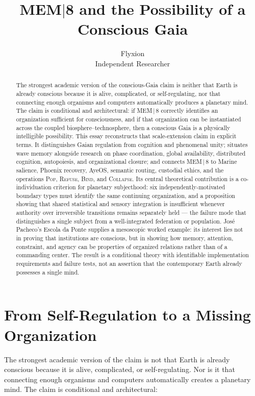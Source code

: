 \documentclass[11pt]{article}
\title{\textbf{MEM\texorpdfstring{$|$}{|}8 and the Possibility of a Conscious Gaia}}
\author{Flyxion \\ \small Independent Researcher}
\date{}
\newcommand{\Pop}{\textsc{Pop}}
\newcommand{\Refuse}{\textsc{Refuse}}
\newcommand{\Bind}{\textsc{Bind}}
\newcommand{\Collapse}{\textsc{Collapse}}
\begin{document}
\maketitle

\begin{abstract}
\noindent The strongest academic version of the conscious-Gaia claim is neither that Earth is already conscious because it is alive, complicated, or self-regulating, nor that connecting enough organisms and computers automatically produces a planetary mind. The claim is conditional and architectural: if MEM\,$|$\,8 correctly identifies an organization sufficient for consciousness, and if that organization can be instantiated across the coupled biosphere--technosphere, then a conscious Gaia is a physically intelligible possibility. This essay reconstructs that scale-extension claim in explicit terms. It distinguishes Gaian regulation from cognition and phenomenal unity; situates wave memory alongside research on phase coordination, global availability, distributed cognition, autopoiesis, and organizational closure; and connects MEM\,$|$\,8 to Marine salience, Phoenix recovery, AyeOS, semantic routing, custodial ethics, and the operations \Pop, \Refuse, \Bind, and \Collapse. Its central theoretical contribution is a co-individuation criterion for planetary subjecthood: six independently-motivated boundary types must identify the same continuing organization, and a proposition showing that shared statistical and sensory integration is insufficient whenever authority over irreversible transitions remains separately held --- the failure mode that distinguishes a single subject from a well-integrated federation or population. José Pacheco's Escola da Ponte supplies a mesoscopic worked example: its interest lies not in proving that institutions are conscious, but in showing how memory, attention, constraint, and agency can be properties of organized relations rather than of a commanding center. The result is a conditional theory with identifiable implementation requirements and failure tests, not an assertion that the contemporary Earth already possesses a single mind.
\end{abstract}

\section{From Self-Regulation to a Missing Organization}

The strongest academic version of the claim is not that Earth is already conscious because it is alive, complicated, or self-regulating. Nor is it that connecting enough organisms and computers automatically creates a planetary mind. The claim is conditional and architectural:
\end{document}
